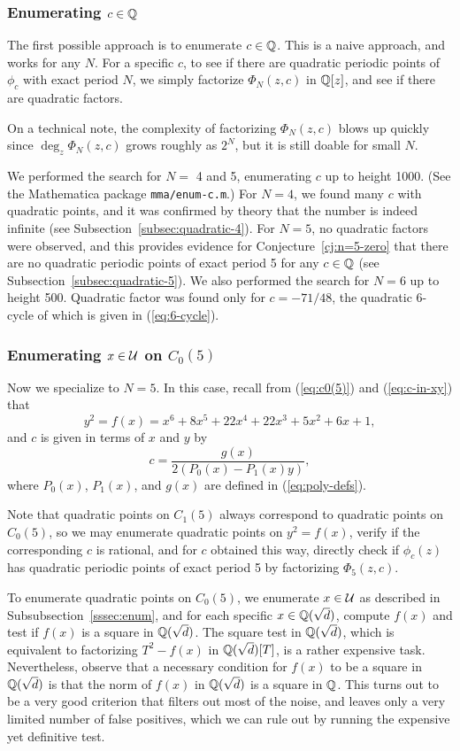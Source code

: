 \subsubsection{Enumerating $c \in \mathbb{Q}$}

The first possible approach is to enumerate $c \in \mathbb{Q}$. This is a
naive approach, and works for any $N$. For a specific $c$, to see if
there are quadratic periodic points of $\phi_c$ with exact period $N$,
we simply factorize $\Phi_N(z, c)$ in $\mathbb{Q}[z]$, and see if there are
quadratic factors.

On a technical note, the complexity of factorizing $\Phi_N(z, c)$
blows up quickly since $\deg_z \Phi_N(z, c)$ grows roughly as $2^N$,
but it is still doable for small $N$.

We performed the search for $N =$ 4 and 5, enumerating $c$ up to
height 1000. (See the Mathematica package \texttt{mma/enum-c.m}.)  For
$N = 4$, we found many $c$ with quadratic points, and it was confirmed
by theory that the number is indeed infinite (see
Subsection~\ref{subsec:quadratic-4}). For $N=5$, no quadratic factors
were observed, and this provides evidence for
Conjecture~\ref{cj:n=5-zero} that there are no quadratic periodic
points of exact period 5 for any $c \in \mathbb{Q}$ (see
Subsection~\ref{subsec:quadratic-5}). We also performed the search for
$N = 6$ up to height 500. Quadratic factor was found only for $c =
-71/48$, the quadratic 6-cycle of which is given in
(\ref{eq:6-cycle}).

\subsubsection{Enumerating $x \in \mathcal{U}$ on $C_0(5)$}

Now we specialize to $N = 5$. In this case, recall from
(\ref{eq:c0(5)}) and (\ref{eq:c-in-xy}) that
\[
y^2 = f(x) = x^6 + 8x^5 + 22x^4 + 22x^3 + 5x^2 + 6x + 1,
\]
and $c$ is given in terms of $x$ and $y$ by
\[
c = \frac{g(x)}{2(P_0(x) - P_1(x) y)},
\]
where $P_0(x)$, $P_1(x)$, and $g(x)$ are defined in
(\ref{eq:poly-defs}).

Note that quadratic points on $C_1(5)$ always correspond to quadratic
points on $C_0(5)$, so we may enumerate quadratic points on $y^2 =
f(x)$, verify if the corresponding $c$ is rational, and for $c$
obtained this way, directly check if $\phi_c(z)$ has quadratic
periodic points of exact period 5 by factorizing $\Phi_5(z, c)$.

To enumerate quadratic points on $C_0(5)$, we enumerate $x \in \mathcal{U}$ as
described in Subsubsection~\ref{sssec:enum}, and for each specific $x
\in \mathbb{Q}(\sqrt{d})$, compute $f(x)$ and test if $f(x)$ is a square in
$\mathbb{Q}(\sqrt{d})$. The square test in $\mathbb{Q}(\sqrt{d})$, which is equivalent
to factorizing $T^2 - f(x)$ in $\mathbb{Q}(\sqrt{d})[T]$, is a rather
expensive task. Nevertheless, observe that a necessary condition for
$f(x)$ to be a square in $\mathbb{Q}(\sqrt{d})$ is that the norm of $f(x)$ in
$\mathbb{Q}(\sqrt{d})$ is a square in $\mathbb{Q}$. This turns out to be a very good
criterion that filters out most of the noise, and leaves only a very
limited number of false positives, which we can rule out by running
the expensive yet definitive test.

